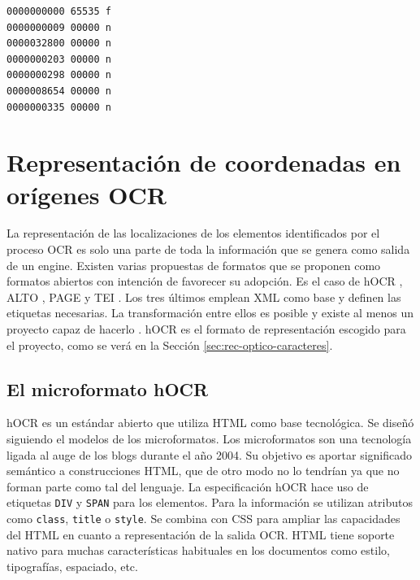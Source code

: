 \begin{lstlisting}[caption={Entradas en la Cross-Reference Table.},label=lst:cross-ref-table]
0000000000 65535 f
0000000009 00000 n
0000032800 00000 n
0000000203 00000 n
0000000298 00000 n
0000008654 00000 n
0000000335 00000 n
\end{lstlisting}



\section{Representación de coordenadas en orígenes OCR}

La representación de las localizaciones de los elementos identificados por el proceso OCR es solo una parte de toda la información que se genera como salida de un engine. Existen varias propuestas de formatos que se proponen como formatos abiertos con intención de favorecer su adopción. Es el caso de hOCR \cite{ocrRepres_hocr_breuel_spec}, ALTO \cite{ocrRepres_alto_spec}, PAGE \cite{ocrRepres_page_pletschacher_paper} y TEI \cite{ocrRepres_tei_project}. Los tres últimos emplean XML como base y definen las etiquetas necesarias. La transformación entre ellos es posible y existe al menos un proyecto capaz de hacerlo
\cite{ocrRepres_conversion_ocrFileformat}. hOCR es el formato de representación escogido para el proyecto, como se verá en la Sección \ref{sec:rec-optico-caracteres}.

\subsection{El microformato hOCR}

hOCR es un estándar abierto que utiliza HTML como base tecnológica. Se diseñó siguiendo el modelos de los microformatos. Los microformatos son una tecnología ligada al auge de los blogs durante el año 2004. Su objetivo es aportar significado semántico a construcciones HTML, que de otro modo no lo tendrían ya que no forman parte como tal del lenguaje. La especificación hOCR hace uso de etiquetas \verb|DIV| y \verb|SPAN| para los elementos. Para la información se utilizan atributos como \verb|class|, \verb|title| o \verb|style|. Se combina con CSS para ampliar las capacidades del HTML en cuanto a representación de la salida OCR. HTML tiene soporte nativo para muchas características habituales en los documentos como estilo, tipografías, espaciado, etc.

